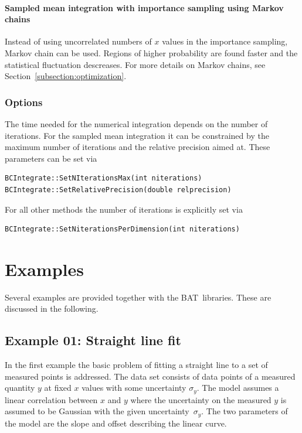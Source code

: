 \documentclass[11pt, a4paper]{article}
\newcommand{\BAT}{{\sc BAT}}
\begin{document}
\paragraph{Sampled mean integration with importance sampling using Markov chains} 

Instead of using uncorrelated numbers of $x$ values in the importance
sampling, Markov chain can be used. Regions of higher probability are
found faster and the statistical fluctuation descreases. For more
details on Markov chains, see Section~\ref{subsection:optimization}.

\subsubsection{Options}

The time needed for the numerical integration depends on the number of
iterations. For the sampled mean integration it can be constrained by
the maximum number of iterations and the relative precision aimed
at. These parameters can be set via
%
\begin{verbatim}
BCIntegrate::SetNIterationsMax(int niterations)
BCIntegrate::SetRelativePrecision(double relprecision) 
\end{verbatim} 

\noindent 
For all other methods the number of iterations is explicitly set via 
%
\begin{verbatim}
BCIntegrate::SetNiterationsPerDimension(int niterations) 
\end{verbatim} 


\section{Examples}
\label{section:examples} 

Several examples are provided together with the \BAT\ libraries. These
are discussed in the following. 


\subsection{Example 01: Straight line fit} 

In the first example the basic problem of fitting a straight line to a
set of measured points is addressed. The data set consists of data
points of a measured quantity $y$ at fixed $x$ values with some
uncertainty $\sigma_{y}$. The model assumes a linear correlation
between $x$ and $y$ where the uncertainty on the measured $y$ is
assumed to be Gaussian with the given uncertainty~$\sigma_{y}$. The
two parameters of the model are the slope and offset describing the
linear curve. \\
\end{document}
